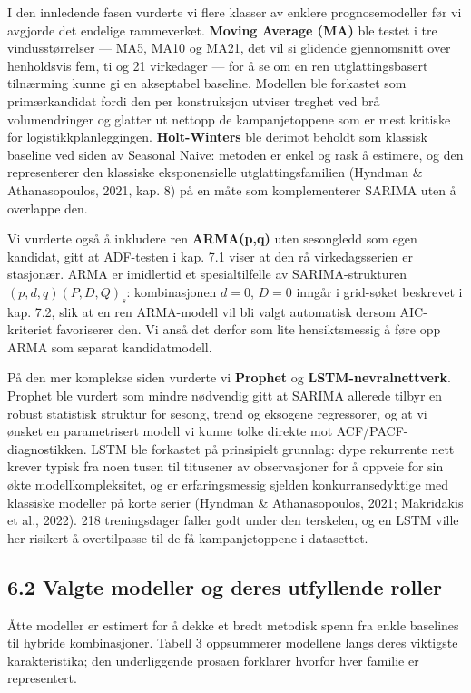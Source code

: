 \documentclass[
  norsk,
  11pt,
  a4paper,
]{article}
\begin{document}
I den innledende fasen vurderte vi flere klasser av enklere
prognosemodeller før vi avgjorde det endelige rammeverket.
\textbf{Moving Average (MA)} ble testet i tre vindusstørrelser --- MA5,
MA10 og MA21, det vil si glidende gjennomsnitt over henholdsvis fem, ti
og 21 virkedager --- for å se om en ren utglattingsbasert tilnærming
kunne gi en akseptabel baseline. Modellen ble forkastet som
primærkandidat fordi den per konstruksjon utviser treghet ved brå
volumendringer og glatter ut nettopp de kampanjetoppene som er mest
kritiske for logistikkplanleggingen. \textbf{Holt-Winters} ble derimot
beholdt som klassisk baseline ved siden av Seasonal Naive: metoden er
enkel og rask å estimere, og den representerer den klassiske
eksponensielle utglattingsfamilien (Hyndman \& Athanasopoulos, 2021,
kap. 8) på en måte som komplementerer SARIMA uten å overlappe den.

Vi vurderte også å inkludere ren \textbf{ARMA(p,q)} uten sesongledd som
egen kandidat, gitt at ADF-testen i kap. 7.1 viser at den rå
virkedagsserien er stasjonær. ARMA er imidlertid et spesialtilfelle av
SARIMA-strukturen \((p,d,q)(P,D,Q)_s\): kombinasjonen \(d=0\), \(D=0\)
inngår i grid-søket beskrevet i kap. 7.2, slik at en ren ARMA-modell vil
bli valgt automatisk dersom AIC-kriteriet favoriserer den. Vi anså det
derfor som lite hensiktsmessig å føre opp ARMA som separat
kandidatmodell.

På den mer komplekse siden vurderte vi \textbf{Prophet} og
\textbf{LSTM-nevralnettverk}. Prophet ble vurdert som mindre nødvendig
gitt at SARIMA allerede tilbyr en robust statistisk struktur for sesong,
trend og eksogene regressorer, og at vi ønsket en parametrisert modell
vi kunne tolke direkte mot ACF/PACF-diagnostikken. LSTM ble forkastet på
prinsipielt grunnlag: dype rekurrente nett krever typisk fra noen tusen
til titusener av observasjoner for å oppveie for sin økte
modellkompleksitet, og er erfaringsmessig sjelden konkurransedyktige med
klassiske modeller på korte serier (Hyndman \& Athanasopoulos, 2021;
Makridakis et al., 2022). 218 treningsdager faller godt under den
terskelen, og en LSTM ville her risikert å overtilpasse til de få
kampanjetoppene i datasettet.

\subsection{6.2 Valgte modeller og deres utfyllende
roller}\label{valgte-modeller-og-deres-utfyllende-roller}

Åtte modeller er estimert for å dekke et bredt metodisk spenn fra enkle
baselines til hybride kombinasjoner. Tabell 3 oppsummerer modellene
langs deres viktigste karakteristika; den underliggende prosaen
forklarer hvorfor hver familie er representert.
\end{document}
